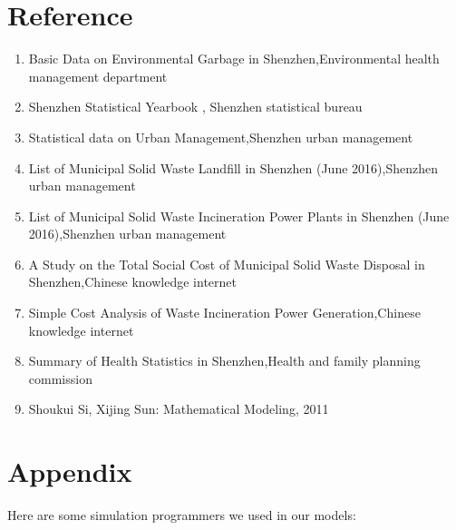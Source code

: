 \documentclass[UTF8]{article}
\begin{document}
\section{Reference}
\begin{enumerate}[(1)]
\item Basic Data on Environmental Garbage in Shenzhen,Environmental health management department
\item Shenzhen Statistical Yearbook , Shenzhen statistical bureau
\item Statistical data on Urban Management,Shenzhen urban management
\item List of Municipal Solid Waste Landfill in Shenzhen (June 2016),Shenzhen urban management
\item List of Municipal Solid Waste Incineration Power Plants in Shenzhen (June 2016),Shenzhen urban management
\item A Study on the Total Social Cost of Municipal Solid Waste Disposal in Shenzhen,Chinese knowledge internet
\item Simple Cost Analysis of Waste Incineration Power Generation,Chinese knowledge internet
\item Summary of Health Statistics in Shenzhen,Health and family planning commission
\item Shoukui Si, Xijing Sun: Mathematical Modeling, 2011
\end{enumerate}
\newpage

\section{Appendix}
Here are some simulation programmers we used in our models:
\end{document}
